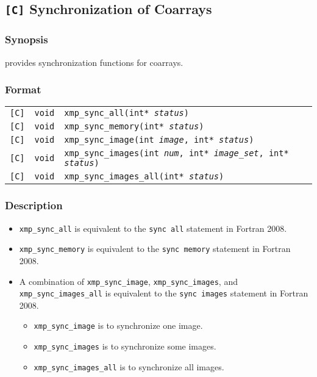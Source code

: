 \subsection{{\tt [C]} Synchronization of Coarrays} 
\subsubsection*{Synopsis}
{\XMPC} provides synchronization functions for coarrays.

\subsubsection*{Format}
\begin{tabular}{lll}
\verb![C]!&  {\tt void}& {\tt xmp\_sync\_all(int* {\it status})} \\
\verb![C]!&  {\tt void}& {\tt xmp\_sync\_memory(int* {\it status})} \\
\verb![C]!&  {\tt void}& {\tt xmp\_sync\_image(int {\it image}, int* {\it status})} \\
\verb![C]!&  {\tt void}& {\tt xmp\_sync\_images(int {\it num}, int* {\it image\_set}, int* {\it status})} \\
\verb![C]!&  {\tt void}& {\tt xmp\_sync\_images\_all(int* {\it status})}
\end{tabular}

\subsubsection*{Description}

\begin{itemize}
 \item {\tt xmp\_sync\_all} is equivalent to the {\tt sync all} statement in Fortran 2008.
 \item {\tt xmp\_sync\_memory} is equivalent to the {\tt sync memory} statement in Fortran 2008.
 \item A combination of {\tt xmp\_sync\_image}, {\tt xmp\_sync\_images}, and {\tt xmp\_sync\_images\_all} 
   is equivalent to the {\tt sync images} statement in Fortran 2008.
  \begin{itemize}
    \item {\tt xmp\_sync\_image} is to synchronize one image.
    \item {\tt xmp\_sync\_images} is to synchronize some images.
    \item {\tt xmp\_sync\_images\_all} is to synchronize all images.
  \end{itemize}
\end{itemize}

